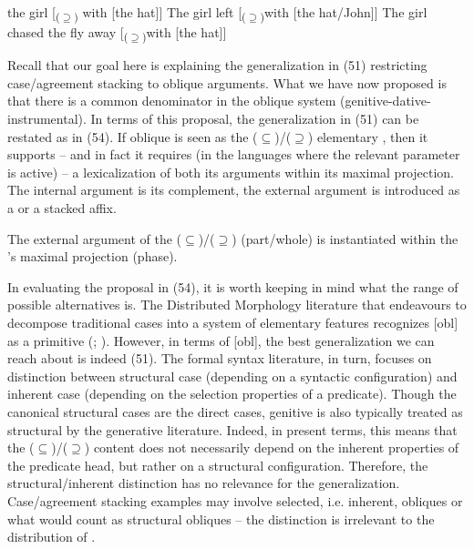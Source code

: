 \documentclass[output=paper]{langsci/langscibook}
\begin{document}
\ea%
    \label{ex:manzini:53}
    \ea  the girl [\textsubscript{($\supseteq$)} with [the hat]]
    \ex  The girl left [\textsubscript{($\supseteq$)}with [the hat/John]]
    \ex  The girl chased the fly away [\textsubscript{($\supseteq$)}with [the hat]]
    \z
\z
  
Recall that our goal here is explaining the generalization in (51) restricting case\slash agreement stacking to oblique arguments. What we have now proposed is that there is a common denominator in the oblique system (genitive-dative-instrumental). In terms of this proposal, the generalization in (51) can be restated as in (54). If oblique is seen as the ($\subseteq$)/($\supseteq$) elementary , then it supports – and in fact it requires (in the languages where the relevant parameter is active) – a lexicalization of both its arguments within its maximal projection. The internal argument is its complement, the external argument is introduced as a  or a stacked affix.

\ea%
    \label{ex:manzini:54}
    The external argument of the ($\subseteq$)/($\supseteq$)  (part/whole) is instantiated within the ’s maximal projection (phase).
\z

In evaluating the proposal in (54), it is worth keeping in mind what the range of possible alternatives is. The Distributed Morphology literature that endeavours to decompose traditional cases into a system of elementary features recognizes [obl] as a primitive (\citealt{Halle1998}; \citealt{Calabrese2008}). However, in terms of [obl], the best generalization we can reach about  is indeed (51). The formal syntax literature, in turn, focuses on  distinction between structural case (depending on a syntactic configuration) and inherent case (depending on the selection properties of a predicate). Though the canonical structural cases are the direct cases, genitive is also typically treated as structural by the generative literature. Indeed, in present terms, this means that the ($\subseteq$)/($\supseteq$) content does not necessarily depend on the inherent properties of the predicate head, but rather on a structural configuration. Therefore, the structural\slash inherent distinction has no relevance for the  generalization. Case\slash agreement stacking examples may involve selected, i.e. inherent, obliques or what would count as structural obliques  – the distinction is irrelevant to the distribution of . 
\end{document}
